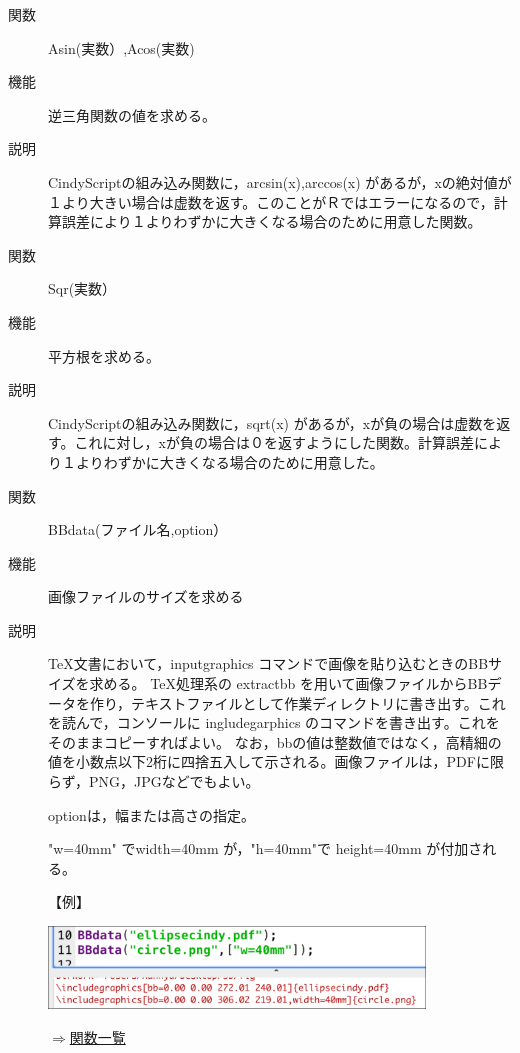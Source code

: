 \documentclass[papersize,a4paper,12pt,uplatex]{jsarticle}
\begin{document}
\begin{description}

\hypertarget{asin}{}
\item[関数]Asin(実数）,Acos(実数)
\item[機能]逆三角関数の値を求める。
\item[説明]CindyScriptの組み込み関数に，arcsin(x),arccos(x) があるが，xの絶対値が１より大きい場合は虚数を返す。このことがＲではエラーになるので，計算誤差により１よりわずかに大きくなる場合のために用意した関数。

\vspace{\baselineskip}
\hypertarget{sqr}{}
\item[関数]Sqr(実数）
\item[機能]平方根を求める。
\item[説明]CindyScriptの組み込み関数に，sqrt(x) があるが，xが負の場合は虚数を返す。これに対し，xが負の場合は０を返すようにした関数。計算誤差により１よりわずかに大きくなる場合のために用意した。

\vspace{\baselineskip}
\hypertarget{bbdata}{}
\item[関数]BBdata(ファイル名,option）
\item[機能]画像ファイルのサイズを求める
\item[説明]TeX文書において，inputgraphics コマンドで画像を貼り込むときのBBサイズを求める。
TeX処理系の extractbb を用いて画像ファイルからBBデータを作り，テキストファイルとして作業ディレクトリに書き出す。これを読んで，コンソールに ingludegarphics のコマンドを書き出す。これをそのままコピーすればよい。 なお，bbの値は整数値ではなく，高精細の値を小数点以下2桁に四捨五入して示される。画像ファイルは，PDFに限らず，PNG，JPGなどでもよい。

optionは，幅または高さの指定。

"w=40mm" でwidth=40mm が，"h=40mm"で height=40mm が付加される。

\vspace{\baselineskip}
【例】

\vspace{\baselineskip}
\includegraphics[bb=0.00 0.00 562.03 124.01,width=10cm]{Fig/bbdata.pdf} 

\begin{flushright}\hyperlink{functionlist}{$\Rightarrow$関数一覧}\end{flushright}


\end{description}
\end{document}
